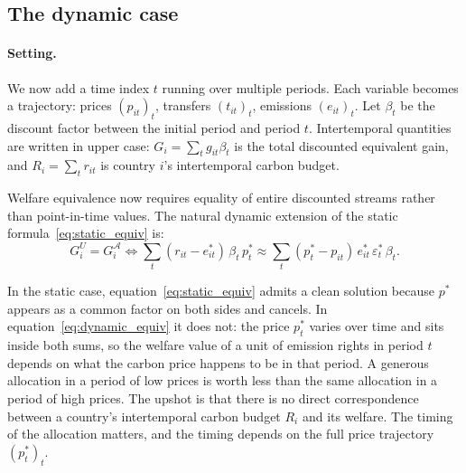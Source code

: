 \documentclass[12pt,english]{article}
\begin{document}
\subsection{The dynamic case}
\label{sec:dynamic}

\paragraph{Setting.}
We now add a time index $t$ running over multiple periods. Each variable becomes a trajectory: prices $(p_{it})_t$, transfers $(t_{it})_t$, emissions $(e_{it})_t$. Let $\beta_t$ be the discount factor between the initial period and period $t$. Intertemporal quantities are written in upper case: $G_i = \sum_t g_{it}\beta_t$ is the total discounted equivalent gain, and $R_i = \sum_t r_{it}$ is country $i$'s intertemporal carbon budget.

Welfare equivalence now requires equality of entire discounted streams rather than point-in-time values. The natural dynamic extension of the static formula~\eqref{eq:static_equiv} is:
\begin{equation}
    G^U_i = G^{\mathcal{A}}_i
    \iff
    \sum_t (r_{it} - e^*_{it})\,\beta_t\,p^*_t
    \approx
    \sum_t (p^*_t - p_{it})\,e^*_{it}\,\varepsilon^*_t\,\beta_t.
    \label{eq:dynamic_equiv}
\end{equation}

In the static case, equation~\eqref{eq:static_equiv} admits a clean solution because $p^*$ appears as a common factor on both sides and cancels. In equation~\eqref{eq:dynamic_equiv} it does not: the price $p^*_t$ varies over time and sits inside both sums, so the welfare value of a unit of emission rights in period $t$ depends on what the carbon price happens to be in that period. A generous allocation in a period of low prices is worth less than the same allocation in a period of high prices. The upshot is that there is no direct correspondence between a country's intertemporal carbon budget $R_i$ and its welfare. The timing of the allocation matters, and the timing depends on the full price trajectory $(p^*_t)_t$.
\end{document}
